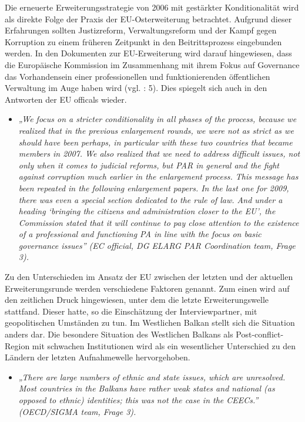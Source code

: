 Die erneuerte Erweiterungsstrategie von 2006 mit gestärkter Konditionalität wird als direkte Folge der Praxis der EU-Osterweiterung betrachtet. Aufgrund dieser Erfahrungen sollten Justizreform, Verwaltungsreform und der Kampf gegen Korruption zu einem früheren Zeitpunkt in den Beitrittsprozess eingebunden werden. In den Dokumenten zur EU-Erweiterung wird darauf hingewiesen, dass die Europäische Kommission im Zusammenhang mit ihrem Fokus auf Governance das Vorhandensein einer professionellen und funktionierenden öffentlichen Verwaltung im Auge haben wird (vgl. \cite{eurcom06c}: 5). Dies spiegelt sich auch in den Antworten der EU officals wieder.
\begin{itemize}[label={}]
\item \textit{„We focus on a stricter conditionality in all phases of the process, because we realized that in the previous enlargement rounds, we were not as strict as we should have been perhaps, in particular with these two countries that became members in 2007. We also realized that we need to address difficult issues, not only when it comes to judicial reforms, but PAR in general and the fight against corruption much earlier in the enlargement process. This message has been repeated in the following enlargement papers. In the last one for 2009, there was even a special section dedicated to the rule of law. And under a heading ‘bringing the citizens and administration closer to the EU’, the Commission stated that it will continue to pay close attention to the existence of a professional and functioning PA in line with the focus on basic governance issues” (EC official, DG ELARG PAR Coordination team, Frage 3). }
\end{itemize}
Zu den Unterschieden im Ansatz der EU zwischen der letzten und der aktuellen Erweiterungsrunde werden verschiedene Faktoren genannt. Zum einen wird auf den zeitlichen Druck hingewiesen, unter dem die letzte Erweiterungswelle stattfand. Dieser hatte, so die Einschätzung der Interviewpartner, mit geopolitischen Umständen zu tun. Im Westlichen Balkan stellt sich die Situation anders dar. Die besondere Situation des Westlichen Balkans als Post-conflict-Region mit schwachen Institutionen wird als ein wesentlicher Unterschied zu den Ländern der letzten Aufnahmewelle hervorgehoben.
\begin{itemize}[label={}]
\item \textit{„There are large numbers of ethnic and state issues, which are unresolved. Most countries in the Balkans have rather weak states and national (as opposed to ethnic) identities; this was not the case in the CEECs.” (OECD/SIGMA team, Frage 3).}
\end{itemize}
